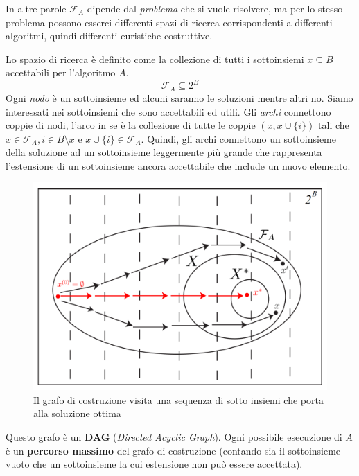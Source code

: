 \documentclass{article}
\begin{document}
    In altre parole $\mathcal{F}_A$ dipende dal \textit{problema} che si vuole risolvere, ma per lo stesso
    problema possono esserci differenti spazi di ricerca corrispondenti a differenti
    algoritmi, quindi differenti euristiche costruttive.

    Lo spazio di ricerca è definito come la collezione di tutti i sottoinsiemi $x\subseteq B$ accettabili
    per l'algoritmo $A$.
    $$\mathcal{F}_A\subseteq 2^B$$
    Ogni \textit{nodo} è un sottoinsieme ed alcuni saranno le soluzioni mentre altri no. Siamo interessati nei
    sottoinsiemi che sono accettabili ed utili. Gli \textit{archi} connettono coppie di nodi,
    l'arco in se è la collezione di tutte le coppie $(x,x\cup\{i\})$ tali che
$x\in \mathcal{F}_A ,i\in B\setminus x$ e $x\cup\{i\}\in \mathcal{F}_A$. Quindi, gli archi connettono
    un sottoinsieme della soluzione ad un sottoinsieme leggermente più grande che rappresenta l'estensione
    di un sottoinsieme ancora accettabile che include un nuovo elemento.
    \begin{figure}[H]
        \centering
        \includegraphics[scale=0.6]{images/cons_graph.png}
        \caption{Il grafo di costruzione visita una sequenza di sotto insiemi che porta alla soluzione ottima}
    \end{figure}
    Questo grafo è un \textbf{DAG} (\textit{Directed Acyclic Graph}). Ogni possibile esecuzione di
$A$ è un \textbf{percorso massimo} del grafo di costruzione (contando sia il sottoinsieme
    vuoto che un sottoinsieme la cui estensione non può essere accettata).
\end{document}
